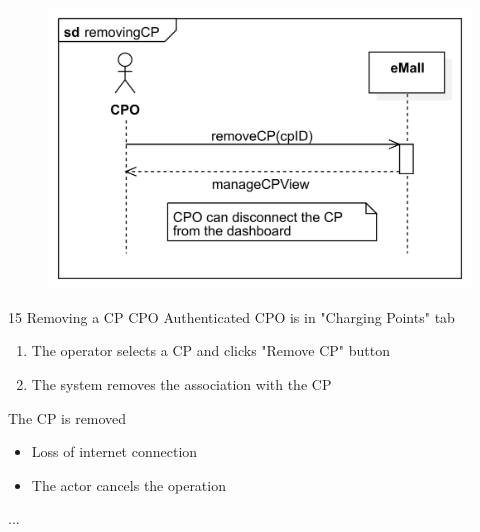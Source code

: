 \usecase
{
    \begin{figure}[H]
        \centering
        \includegraphics[scale=0.9]{src/sequence_diagram/removingCP.png}
    \end{figure}
}
{15}
{Removing a CP} %
{CPO} %
{Authenticated CPO is in "Charging Points" tab} %
{ %
    \begin{enumerate}
        \item The operator selects a CP and clicks "Remove CP" button
        \item The system removes the association with the CP
    \end{enumerate}
}
{The CP is removed} %
{ %
    \begin{itemize}
        \item Loss of internet connection
        \item The actor cancels the operation
    \end{itemize}
}
{ %
    ...
}

